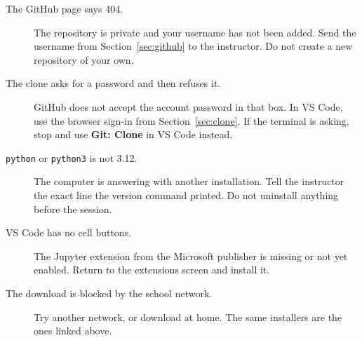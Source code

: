 \documentclass[11pt,a4paper]{article}
\newcommand{\menu}[1]{\textbf{#1}}
\newcommand{\cmd}[1]{\texttt{#1}}
\begin{document}
\begin{description}
\item[The GitHub page says 404.] The repository is private and your username has not been added. Send the username from Section~\ref{sec:github} to the instructor. Do not create a new repository of your own.
\item[The clone asks for a password and then refuses it.] GitHub does not accept the account password in that box. In VS Code, use the browser sign-in from Section~\ref{sec:clone}. If the terminal is asking, stop and use \menu{Git: Clone} in VS Code instead.
\item[\cmd{python} or \cmd{python3} is not 3.12.] The computer is answering with another installation. Tell the instructor the exact line the version command printed. Do not uninstall anything before the session.
\item[VS Code has no cell buttons.] The Jupyter extension from the Microsoft publisher is missing or not yet enabled. Return to the extensions screen and install it.
\item[The download is blocked by the school network.] Try another network, or download at home. The same installers are the ones linked above.
\end{description}
\end{document}
